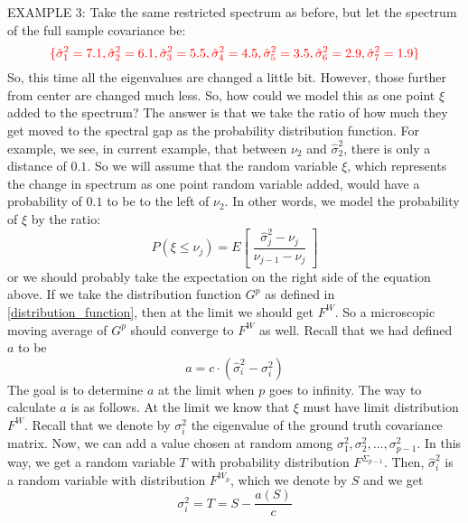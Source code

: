 \documentclass[12pt]{amsart}
\theoremstyle{definition}
\numberwithin{equation}{section}
\numberwithin{equation}{section}
\theoremstyle{remark}
\numberwithin{equation}{section}
\begin{document}
EXAMPLE 3: Take the same restricted spectrum as before, but let the spectrum of the full sample covariance be:
$${\color{red}\{\hat{\sigma}^2_1=7.1,\hat{\sigma}^2_2=6.1,\hat{\sigma}^2_3=5.5,\hat{\sigma}^2_4=4.5,\hat{\sigma}^2_5=3.5,\hat{\sigma}^2_6=2.9,\hat{\sigma}^2_7=1.9\}}$$
So, this time all the eigenvalues are changed a little bit. However, those further from center are changed much less. So, how could we model this as one point $\xi$ added to the spectrum? The answer is that we take the ratio of how much they get moved
to the spectral gap as the probability distribution function. For example, we see, in current example, that between $\nu_2$ and $\hat{\sigma}^2_2$, there is only a distance of $0.1$. So we will assume that the random variable $\xi$, which represents the change in spectrum as one point random variable added, would have a probability of $0.1$ to be to the left of  $\nu_2$.
In other words, we model the probability of $\xi$ by the ratio:
\begin{equation}
	\label{basic}
	P(\xi\leq \nu_j)=E\left[\;\frac{\hat{\sigma}^2_j-\nu_j}{\nu_{j-1}-\nu_j}\;\right]
	\end{equation}
or we should probably take the expectation on the right side of the equation above. If we take the distribution function $G^p$ as defined in \ref{distribution_function}, then at the limit we should get $F^W$. So a microscopic moving average of $G^p$ should converge to $F^W$ as well. Recall that we had defined $a$ to be
$$a=c\cdot(\hat{\sigma}^2_i-\sigma^2_i)$$
The goal is to determine $a$ at the limit when $p$ goes to infinity.
The way to calculate $a$ is as follows. At the limit we know that $\xi$ must have limit distribution $F^W$. Recall that we denote by $\sigma^2_i$ the eigenvalue of the ground truth
covariance matrix. Now, we can add a value chosen at random among
$\sigma_1^2,\sigma_2^2,\ldots,\sigma^{2}_{p-1}$.
In this way, we get a random variable $T$ with probability distribution $F^{\Sigma_{p-1}}$. Then, $\hat{\sigma}^2_i$ is a random variable with distribution $F^{W_{p}}$, which we denote
by $S$ and we get
$$\sigma^2_i=T=S-\frac{a(S)}{c}$$
\end{document}
